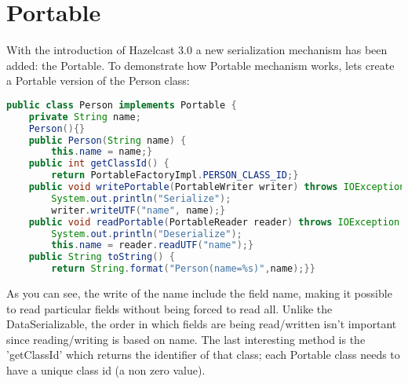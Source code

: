 \section{Portable}
With the introduction of Hazelcast 3.0 a new serialization mechanism has been added: the Portable. To demonstrate how Portable mechanism works, lets create a Portable version of the Person class:
\begin{lstlisting}[language=java]
public class Person implements Portable {
    private String name;
    Person(){}
    public Person(String name) {
        this.name = name;}
    public int getClassId() {
        return PortableFactoryImpl.PERSON_CLASS_ID;}
    public void writePortable(PortableWriter writer) throws IOException {
        System.out.println("Serialize");
        writer.writeUTF("name", name);}
    public void readPortable(PortableReader reader) throws IOException {
        System.out.println("Deserialize");
        this.name = reader.readUTF("name");}
    public String toString() {
        return String.format("Person(name=%s)",name);}}
\end{lstlisting}
As you can see, the write of the name include the field name, making it possible to read particular fields without being forced to read all.  Unlike the DataSerializable, the order in which fields are being read/written isn't important since reading/writing is based  on name. The last interesting method is the 'getClassId' which returns the identifier of that class; each Portable class needs to have a unique class id (a non zero value).

